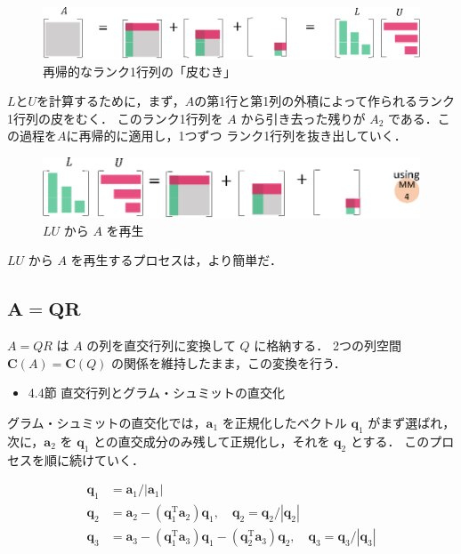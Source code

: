 \documentclass[letterpaper]{article}
\DeclareRobustCommand\transp{^{\mathrm{T}}}
\begin{document}
\begin{figure}[H]
  \includegraphics[keepaspectratio, width=\linewidth]{LU1-j.eps}
\caption{再帰的なランク1行列の「皮むき」}
\end{figure}

$L$と$U$を計算するために，まず，$A$の第1行と第1列の外積によって作られるランク1行列の皮をむく．
このランク1行列を $A$ から引き去った残りが $A_2$ である．この過程を$A$に再帰的に適用し，1つずつ
ランク1行列を抜き出していく．

\begin{figure}[H]
  \includegraphics[keepaspectratio, width=\linewidth]{LU2-j.eps}
\caption{$LU$ から $A$ を再生}
\end{figure}

$LU$ から $A$ を再生するプロセスは，より簡単だ．

\clearpage

\subsection{$\boldsymbol{A=QR}$}

$A=QR$ は $A$ の列を直交行列に変換して $Q$ に格納する．
2つの列空間 $\bm{C}(A) = \bm{C}(Q)$ の関係を維持したまま，この変換を行う．

\begin{itemize}
  \item 4.4節 直交行列とグラム・シュミットの直交化
\end{itemize}

グラム・シュミットの直交化では，$\bm{a}_1$ を正規化したベクトル $\bm{q}_1$ がまず選ばれ，
次に，$\bm{a}_2$ を $\bm{q}_1$ との直交成分のみ残して正規化し，それを $\bm{q}_2$ とする．
このプロセスを順に続けていく．

\begin{align*}
  \bm{q}_1 &= \bm{a}_1/|\bm{a}_1| \\
  \bm{q}_2 &= \bm{a}_2 - (\bm{q}_1\transp \bm{a}_2)\bm{q}_1 , \quad \bm{q}_2 = \bm{q}_2/|\bm{q}_2| \\
  \bm{q}_3 &= \bm{a}_3 - (\bm{q}_1\transp \bm{a}_3)\bm{q}_1 - (\bm{q}_2\transp \bm{a}_3)\bm{q}_2, \quad \bm{q}_3 = \bm{q}_3/|\bm{q}_3|
\end{align*}
\end{document}
